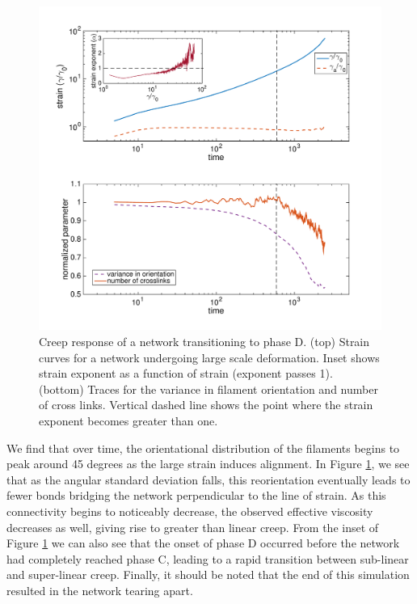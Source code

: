 \begin{figure}[h!]
\centering
\includegraphics[width=\hsize]{slippage/tearer}
\caption{\label{fig:tearer} Creep response of a network transitioning to phase D. (top)  Strain curves for a network undergoing large scale deformation.  Inset shows strain exponent as a function of strain (exponent passes 1).  (bottom)  Traces for the variance in filament orientation and number of cross links.  Vertical dashed line shows the point where the strain exponent becomes greater than one.}
\end{figure}

We find that over time, the orientational distribution of the filaments begins to peak around 45 degrees as the large strain induces alignment.  In Figure \ref{fig:tearer}, we see that as the angular standard deviation falls, this reorientation eventually leads to fewer bonds bridging the network perpendicular to the line of strain.  As this connectivity begins to noticeably decrease, the observed effective viscosity decreases as well, giving rise to greater than linear creep.  From the inset of Figure \ref{fig:tearer} we can also see that the onset of phase D occurred before the network had completely reached phase C, leading to a rapid transition between sub-linear and super-linear creep.  Finally, it should be noted that the end of this simulation resulted in the network tearing apart.  



